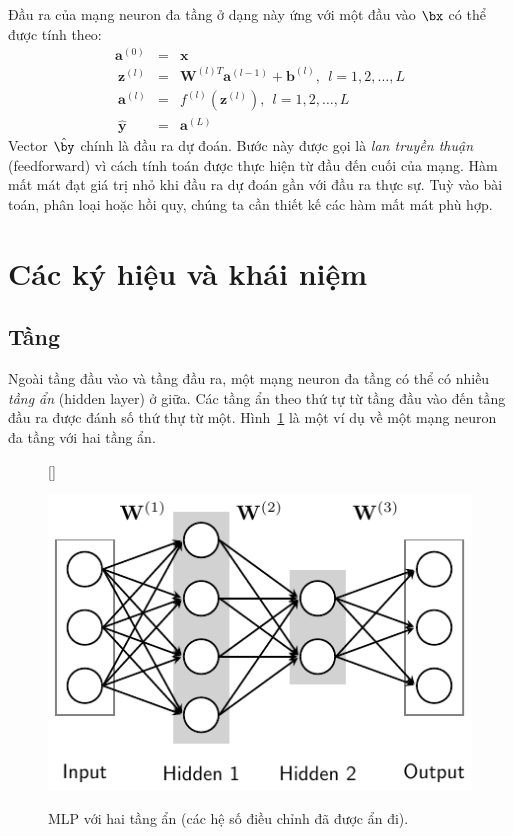 
Đầu ra của mạng neuron đa tầng ở dạng này ứng với một đầu vào $\bx$ có thể
được tính theo:
\begin{eqnarray} \mathbf{a}^{(0)} &=& \mathbf{x} \\\
\mathbf{z}^{(l)}  &=& \mathbf{W}^{(l)T}\mathbf{a}^{(l-1)} + \mathbf{b}^{(l)},~~ l =  1, 2, \dots, L \\\ 
\mathbf{a}^{(l)} &=& f^{(l)}(\mathbf{z}^{(l)}), ~~ l =  1, 2, \dots, L \\\ 
\mathbf{\hat{y}} &=& \mathbf{a}^{(L)} 
\end{eqnarray} 
Vector $\hat{\by}$ chính là đầu ra dự đoán. Bước này được gọi là \textit{lan truyền thuận} (feedforward) vì cách
tính toán được thực hiện từ đầu đến cuối của mạng. Hàm mất mát đạt
giá trị nhỏ khi đầu ra dự đoán gần với đầu ra thực sự. Tuỳ vào bài toán, phân loại hoặc hồi quy, chúng ta cần thiết kế các hàm mất mát phù hợp.

\section{Các ký hiệu và khái niệm}

\index{tầng -- layer}
 
\subsection{Tầng}
Ngoài tầng đầu vào và tầng đầu ra, một mạng neuron đa tầng có thể có nhiều
\textit{tầng ẩn} ({hidden layer}) ở giữa. Các tầng ẩn theo thứ tự từ tầng đầu
vào đến tầng đầu ra được đánh số thứ thự từ một. Hình~\ref{fig:14_3} là một ví
dụ về một mạng neuron đa tầng với hai tầng ẩn.
 
 
\begin{figure}[t]
    [\FBwidth]
    {\caption{ 
    MLP với hai tầng ẩn (các hệ số điều chỉnh đã được ẩn đi).
    }
    \label{fig:14_3}}
    { %
    \includegraphics[width=.5\textwidth]{Chapters/05_NeuralNetworks/14_mlp/latex/multi_layers.pdf}
    }
\end{figure}

